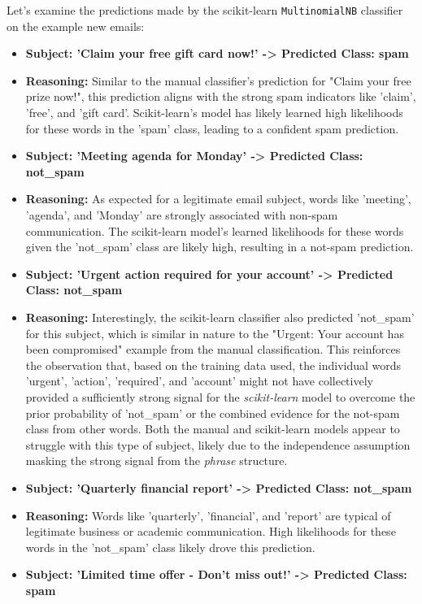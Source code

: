 \documentclass[12pt,a4paper]{article}
\begin{document}
Let's examine the predictions made by the scikit-learn \texttt{MultinomialNB} classifier on the example new emails:

\begin{itemize}
    \item \textbf{Subject: 'Claim your free gift card now!' -> Predicted Class: spam}
    \item \textbf{Reasoning:} Similar to the manual classifier's prediction for "Claim your free prize now!", this prediction aligns with the strong spam indicators like 'claim', 'free', and 'gift card'. Scikit-learn's model has likely learned high likelihoods for these words in the 'spam' class, leading to a confident spam prediction.
    \item \textbf{Subject: 'Meeting agenda for Monday' -> Predicted Class: not\_spam}
    \item \textbf{Reasoning:} As expected for a legitimate email subject, words like 'meeting', 'agenda', and 'Monday' are strongly associated with non-spam communication. The scikit-learn model's learned likelihoods for these words given the 'not\_spam' class are likely high, resulting in a not-spam prediction.
    \item \textbf{Subject: 'Urgent action required for your account' -> Predicted Class: not\_spam}
    \item \textbf{Reasoning:} Interestingly, the scikit-learn classifier also predicted 'not\_spam' for this subject, which is similar in nature to the "Urgent: Your account has been compromised" example from the manual classification. This reinforces the observation that, based on the training data used, the individual words 'urgent', 'action', 'required', and 'account' might not have collectively provided a sufficiently strong signal for the \textit{scikit-learn} model to overcome the prior probability of 'not\_spam' or the combined evidence for the not-spam class from other words. Both the manual and scikit-learn models appear to struggle with this type of subject, likely due to the independence assumption masking the strong signal from the \textit{phrase} structure.
    \item \textbf{Subject: 'Quarterly financial report' -> Predicted Class: not\_spam}
    \item \textbf{Reasoning:} Words like 'quarterly', 'financial', and 'report' are typical of legitimate business or academic communication. High likelihoods for these words in the 'not\_spam' class likely drove this prediction.
    \item \textbf{Subject: 'Limited time offer - Don't miss out!' -> Predicted Class: spam}

\end{itemize}
\end{document}

